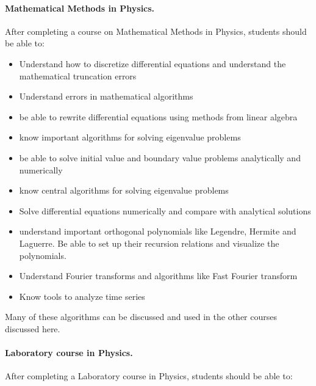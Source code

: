 \documentclass[graybox,envcountchap,sectrefs]{svmult}
\begin{document}
\paragraph{Mathematical Methods in  Physics.}
After completing a course on Mathematical Methods in Physics, students should be able to:
\begin{itemize}
\item Understand how to discretize differential equations and understand the mathematical truncation errors

\item Understand errors in mathematical algorithms

\item be able to rewrite differential equations using methods from linear algebra

\item know important algorithms for solving eigenvalue problems

\item be able to solve initial value and boundary value problems analytically and numerically

\item know central algorithms for solving eigenvalue problems

\item Solve differential equations numerically and compare with analytical solutions

\item understand  important orthogonal polynomials like Legendre, Hermite and Laguerre. Be able to set up their recursion relations and visualize the polynomials.

\item Understand Fourier transforms and algorithms like Fast Fourier transform

\item Know tools to analyze time series
\end{itemize}

\noindent
Many of these algorithms can be discussed and used in the other courses discussed here.

\paragraph{Laboratory course in Physics.}
After completing a  Laboratory course in Physics, students should be able to:
\end{document}
